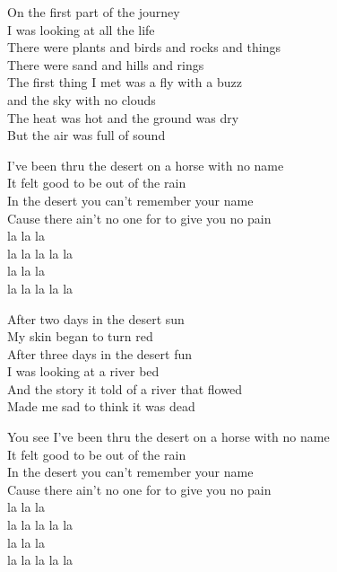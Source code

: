 
\ve{}
On the first part of the journey\\
I was looking at all the life\\
There were plants and birds and rocks and things\\
There were sand and hills and rings\\
The first thing I met was a fly with a buzz\\
and the sky with no clouds\\
The heat was hot and the ground was dry\\
But the air was full of sound

\ve{}
I've been thru the desert on a horse with no name\\
It felt good to be out of the rain\\
In the desert you can't remember your name\\
Cause there ain't no one for to give you no pain\\
la la la\\
la la la la la\\
la la la\\
la la la la la

\ve{}
After two days in the desert sun\\
My skin began to turn red\\
After three days in the desert fun\\
I was looking at a river bed\\
And the story it told of a river that flowed\\
Made me sad to think it was dead

\ve{}
You see I've been thru the desert on a horse with no name\\
It felt good to be out of the rain\\
In the desert you can't remember your name\\
Cause there ain't no one for to give you no pain\\
la la la\\
la la la la la\\
la la la\\
la la la la la

